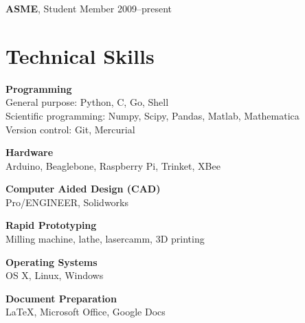 \documentclass[]{res}
\begin{document}
\begin{resume}
\textbf{ASME}, Student Member \hfill 2009--present


\section{Technical Skills}
\vspace{0.1in}

\textbf{Programming} \\
General purpose: Python, C, Go, Shell \\
Scientific programming: Numpy, Scipy, Pandas, Matlab, Mathematica \\
Version control: Git, Mercurial

\textbf{Hardware} \\
Arduino, Beaglebone, Raspberry Pi, Trinket, XBee

\textbf{Computer Aided Design (CAD)} \\
Pro/ENGINEER, Solidworks

\textbf{Rapid Prototyping} \\
Milling machine, lathe, lasercamm, 3D printing

\textbf{Operating Systems} \\
OS X, Linux, Windows

\textbf{Document Preparation} \\
LaTeX, Microsoft Office, Google Docs


\end{resume}
\end{document}
